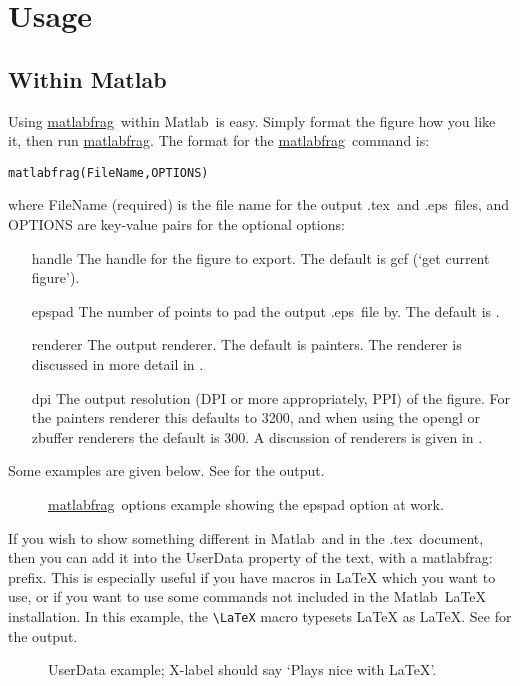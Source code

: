\documentclass[a4paper,11pt]{article}
\newcommand\matlabfrag{\texorpdfstring{\href{http://www.mathworks.com/matlabcentral/fileexchange/21286}{{\ttfamily matlabfrag}}}{matlabfrag}}
\newcommand\matlab{\texorpdfstring{{\sc Matlab}}{Matlab}}
\newcommand\tex{\texorpdfstring{{\sc .tex}}{.tex}}
\newcommand\eps{\texorpdfstring{{\sc .eps}}{.eps}}
\def\'#1'{{\ttfamily \textquotesingle #1\textquotesingle}}
\begin{document}
  \section{Usage}%
    \subsection{Within \matlab}%
      Using \matlabfrag\ within \matlab\ is easy. Simply format the figure how you like it, then run
      \matlabfrag. The format for the \matlabfrag\ command is:
      \begin{verbatim}
matlabfrag(FileName,OPTIONS)
      \end{verbatim}
      where {\ttfamily FileName} (required) is the file name for the output \tex\ and \eps\ files, and 
      {\ttfamily OPTIONS} are key-value pairs for the optional options:
      \begin{itemize}
        \item[{\'handle'}] The handle for the figure to export. The default is {\ttfamily gcf} (`get 
		  current figure').
        \item[{\'epspad'}] The number of points to pad the output \eps\ file by. The default is {\ttfamily [0,0,0,0]}.
        \item[{\'renderer'}] The output renderer. The default is {\ttfamily painters}. The renderer is
          discussed in more detail in .
        \item[{\'dpi'}] The output resolution (DPI or more appropriately, PPI) of the figure.
          For the {\ttfamily painters} renderer this defaults to 3200, and when
          using the {\ttfamily opengl} or {\ttfamily zbuffer} renderers the default is 300.
          A discussion of renderers is given in .
      \end{itemize}
      Some examples are given below.\nobreak
      See  for the output.
      \begin{figure}[ht]
        \centering
        \quad
        \caption{\matlabfrag\ options example showing the {\ttfamily epspad} option at work.}
      \end{figure}
      
      If you wish to show something different in \matlab\ and in the \tex\ document, then you
      can add it into the {\ttfamily UserData} property of the text, with a {\ttfamily matlabfrag:} prefix. This is
      especially useful if you have macros in LaTeX which you want to use, or if you want to use some
      commands not included in the \matlab\ LaTeX installation. In this example, the \verb|\LaTeX| macro
      typesets LaTeX as \LaTeX.
      See  for the output.
      \begin{figure}[ht]
        \centering
        \caption{UserData example; X-label should say `Plays nice with \LaTeX'.}
      \end{figure}
      
\end{document}
